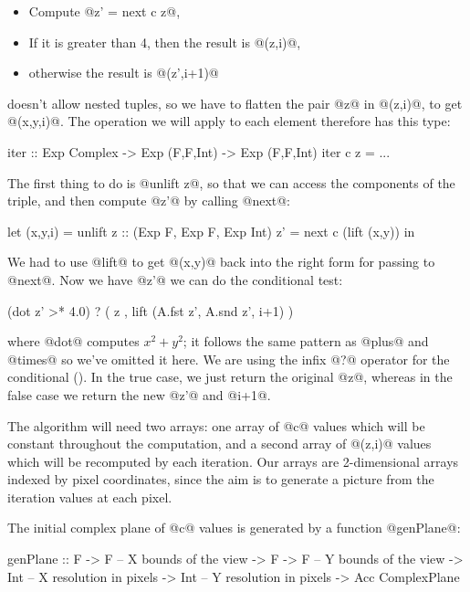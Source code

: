 \begin{itemize}
\item Compute @z' = next c z@,
\item If it is greater than 4, then the result is @(z,i)@,
\item otherwise the result is @(z',i+1)@
\end{itemize}

\acc{} doesn't allow nested tuples, so we have to flatten the pair @z@
in @(z,i)@, to get @(x,y,i)@.  The operation we will apply to each
element therefore has this type:

\begin{haskell}
iter :: Exp Complex -> Exp (F,F,Int) -> Exp (F,F,Int)
iter c z = ...
\end{haskell}

\noindent The first thing to do is @unlift z@, so that we can access
the components of the triple, and then compute @z'@ by calling @next@:

\begin{haskell}
  let
     (x,y,i) = unlift z :: (Exp F, Exp F, Exp Int)
     z' = next c (lift (x,y))
  in
\end{haskell}

\noindent We had to use @lift@ to get @(x,y)@ back into the right form
for passing to @next@.  Now we have @z'@ we can do the conditional
test:

\begin{haskell}
  (dot z' >* 4.0) ?
     ( z
     , lift (A.fst z', A.snd z', i+1)
     )
\end{haskell}

\noindent where @dot@ computes $x^2 + y^2$; it follows the same
pattern as @plus@ and @times@ so we've omitted it here.  We are using
the infix @?@ operator for the conditional ().  In
the true case, we just return the original @z@,
whereas in the false case we return the new @z'@ and @i+1@.

The algorithm will need two arrays: one array of @c@ values which will
be constant throughout the computation, and a second array of @(z,i)@
values which will be recomputed by each iteration.  Our arrays are
2-dimensional arrays indexed by pixel coordinates, since the aim is to
generate a picture from the iteration values at each pixel.

The initial complex plane of @c@ values is generated by a function
@genPlane@:

\begin{haskell}
genPlane :: F -> F   -- X bounds of the view
         -> F -> F   -- Y bounds of the view
         -> Int      -- X resolution in pixels
         -> Int      -- Y resolution in pixels
         -> Acc ComplexPlane
\end{haskell}

